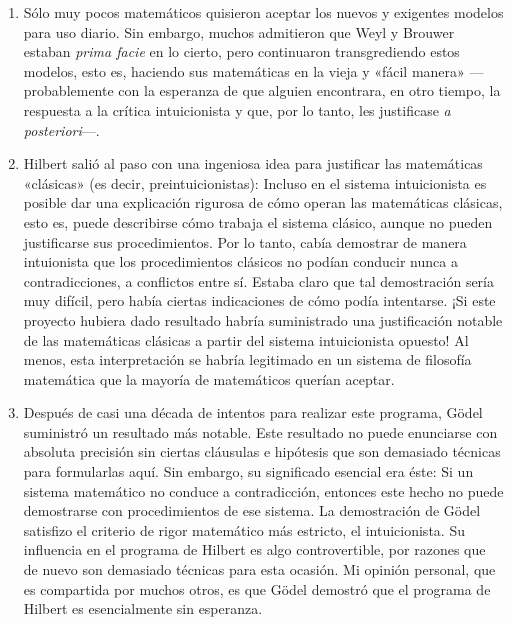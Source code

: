 \documentclass[a4paper, 12pt]{article}
\begin{document}
{\begin{enumerate}
\item  Sólo muy pocos matemáticos quisieron aceptar los nuevos y exigentes modelos para uso diario. Sin embargo, muchos admitieron que Weyl y Brouwer estaban \textit{prima facie} en lo cierto, pero continuaron transgrediendo estos modelos, esto es, haciendo sus matemáticas en la vieja y «fácil manera» ---probablemente con la esperanza de que alguien encontrara, en otro tiempo, la respuesta a la crítica intuicionista y que, por lo tanto, les justificase \textit{a posteriori}---.


\item Hilbert salió al paso con una ingeniosa idea para justificar las matemáticas «clásicas» (es decir, preintuicionistas): Incluso en el sistema intuicionista es posible dar una explicación rigurosa de cómo operan las matemáticas clásicas, esto es, puede describirse cómo trabaja el sistema clásico, aunque no pueden justificarse sus procedimientos. Por lo tanto, cabía demostrar de manera intuionista que los procedimientos clásicos no podían conducir nunca a contradicciones, a conflictos entre sí. Estaba claro que tal demostración sería muy difícil, pero había ciertas indicaciones de cómo podía intentarse. ¡Si este proyecto hubiera dado resultado habría suministrado una justificación notable de las matemáticas clásicas a partir del sistema intuicionista opuesto! Al menos, esta interpretación se habría legitimado en un sistema de filosofía matemática que la mayoría de matemáticos querían aceptar.


\item  Después de casi una década de intentos para realizar este programa, Gödel suministró un resultado más notable. Este resultado no puede enunciarse con absoluta precisión sin ciertas cláusulas e hipótesis que son demasiado técnicas para formularlas aquí. Sin embargo, su significado esencial era éste: Si un sistema matemático no conduce a contradicción, entonces este hecho no puede demostrarse con procedimientos de ese sistema. La demostración de Gödel satisfizo el criterio de rigor matemático más estricto, el intuicionista. Su influencia en el programa de Hilbert es algo controvertible, por razones que de nuevo son
demasiado técnicas para esta ocasión. Mi opinión personal, que es compartida por muchos otros, es que Gödel demostró que el programa de Hilbert es esencialmente sin esperanza.



\end{enumerate}}
\end{document}
